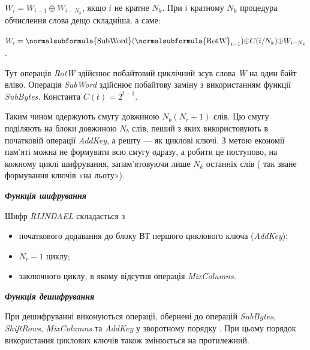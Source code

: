  $W_{i}=W_{i-1}{\oplus}W_{i-N_{k}}$, якщо  $i$ не кратне 
$N_k$. При  $i$ кратному  $N_k$ процедура обчислення слова дещо
складніша, а саме:

{\centering

$W_{i}=\normalsubformula{\text{SubWord}}(\normalsubformula{\text{RotW}}_{i-1}){\oplus}C(i/N_{k}){\oplus}W_{i-N_{k}}$.
\par}

Тут операція\textit{ }\textit{RotW} здійснює побайтовий циклічний зсув слова
\textit{W}\textit{ }на один байт вліво. Операція \textit{SubWord} здійснює
побайтову заміну з використанням функції \textit{SubBytes}\textit{.} Константа 
$C(t)=2^{t-1}$.

Таким чином одержують смугу довжиною  $N_{b}(N_r+1)$ слів. Цю смугу
поділяють на блоки довжиною  $N_b$ слів, пеший з яких використовують в
початковій операції \textit{AddKey}, а решту --- як циклові ключі. З метою
економії пам’яті можна не формувати всю смугу одразу, а робити це поступово, на
кожному циклі шифрування, запам’ятовуючи лише  $N_k$ останніх слів ( так
зване формування ключів «на льоту»).


\bigskip


\bigskip

{\centering\bfseries\itshape
Функція шифрування
\par}


\bigskip


\bigskip

Шифр \textit{RIJNDAEL} складається з 

\liststyleWWviiiNumxxxiii
\begin{itemize}
\item початкового додавання до блоку ВТ першого циклового ключа
(\textit{AddKey});
\item  $N_r-1$ циклу;
\item заключного циклу, в якому відсутня операція \textit{MixColumns.}
\end{itemize}

\bigskip


\bigskip

{\centering\bfseries\itshape
Функція дешифрування
\par}


\bigskip


\bigskip

При дешифруванні виконуються операції, обернені до операцій \textit{SubBytes},
\textit{ShiftRows}, \textit{MixColumns}\textit{ }та \textit{AddKey} у
зворотному порядку . При цьому порядок використання циклових ключів також
змінюється на протилежний.

